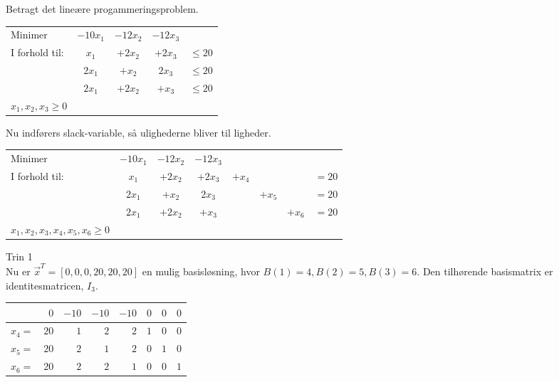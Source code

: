 \begin{eks}
Betragt det lineære progammeringsproblem. 
\begin{center}
\begin{tabular}{ l c c  c  r }
Minimer &$-10x_1$&$-12x_2$ & $-12x_3$&\\
I forhold til: &$x_1$&+$2x_2 $&+$2x_3$ & $\leq 20$\\
&$2x_1$& $+x_2$& $2x_3$ & $\leq 20$\\
&$2x_1$&$+2x_2$&$+x_3$&$\leq 20$\\
$x_1,x_2,x_3\geq 0$
\end{tabular}
\end{center}

Nu indførers slack-variable, så ulighederne bliver til ligheder. 
\begin{center}
\begin{tabular}{ l c c  c c c c r }
Minimer &$-10x_1$&$-12x_2$ & $-12x_3$&&&\\
I forhold til: &$x_1$&+$2x_2 $&+$2x_3$ &$+x_4$&& &$=20$\\
&$2x_1$& $+x_2$& $2x_3$ & & $+x_5$ &&$=20$\\
&$2x_1$&$+2x_2$&$+x_3$&&&$+x_6$&$=20$\\
$x_1,x_2,x_3,x_4,x_5,x_6\geq 0$
\end{tabular}
\end{center}

Trin 1\\
Nu er $\vec{x}^T=[0,0,0,20,20,20]$ en mulig basisløsning, hvor $B(1)=4,B(2)=5,B(3)=6$. Den tilhørende basismatrix er identitesmatricen, $I_3$. 
\begin{center}
\begin{tabular}{r| r|r r r r r r|}
  \hline	
  &$0$&$-10$ &$-10$&$-10$&$0$&$0$&$0$\\ \hline	
  $x_4=$&$20$&$1$&$2$&$2$&$1$&$0$&$0$\\	
  $x_5=$&$20$&$2$&$1$&$2$&$0$&$1$&$0$\\
  $x_6=$&$20$&$2$&$2$&$1$&$0$&$0$&$1$\\
   \hline
\end{tabular}
\end{center}


\end{eks}
